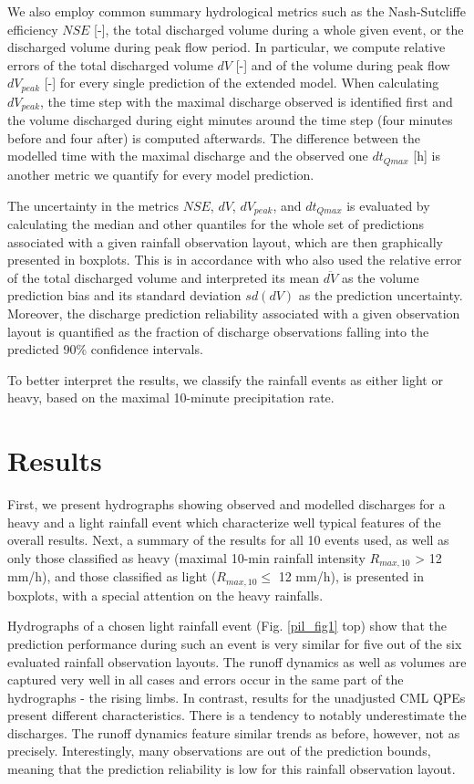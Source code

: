 \documentclass{ctuthesis}\usepackage[]{graphicx}\usepackage[]{color}
\begin{document}
We also employ common summary hydrological metrics such as the Nash-Sutcliffe efficiency $N\!S\!E$ [-], the total discharged volume during a whole given event, or the discharged volume during peak flow period.  In particular, we compute relative errors of the total discharged volume  $dV$ [-] and of the volume during peak flow $dV_{peak}$ [-] for every single prediction of the extended model. When calculating $dV_{peak}$, the time step with the maximal discharge observed is identified first and the volume discharged during eight minutes around the time step (four minutes before and four after) is computed afterwards. The difference between the modelled time with the maximal discharge and the observed one $dt_{Qmax}$ [h] is another metric we quantify for every model prediction. 

The uncertainty in the metrics $N\!S\!E$, $dV$, $dV_{peak}$, and $dt_{Qmax}$ is evaluated by calculating the median and other quantiles for the whole set of predictions associated with a given rainfall observation layout, which are then graphically presented in boxplots.  This is in accordance with \cite{fencl2013assessing} who also used the relative error of the total discharged volume and interpreted its mean $\overline{dV}$ as the volume prediction bias and its standard deviation $sd(dV)$ as the prediction uncertainty. Moreover, the discharge prediction reliability associated with a given observation layout is quantified as the fraction of discharge observations falling into the predicted 90\% confidence intervals.

To better interpret the results, we classify the rainfall events as either light or heavy, based on the maximal 10-minute precipitation rate. 



\section{Results}

First, we present hydrographs showing observed and modelled discharges for a heavy and a light rainfall event which characterize well typical features of the overall results. Next, a summary of the results for all 10 events used, as well as only those classified as heavy (maximal 10-min rainfall intensity $R_{max,10}$ > 12 mm/h), and those classified as light ($R_{max,10} \leq$ 12 mm/h), is presented in  boxplots, with a special attention on the heavy rainfalls.

Hydrographs of a chosen light rainfall event (Fig. \ref{pil_fig1} top) show that the prediction performance during such an event is very similar for five out of the six evaluated rainfall observation layouts. The runoff dynamics as well as volumes are captured very well in all cases and errors occur in the same part of the hydrographs -  the  rising limbs. In contrast, results for the unadjusted CML QPEs present different characteristics. There is a tendency to notably underestimate the discharges. The runoff dynamics feature similar trends as before, however, not as precisely. Interestingly, many observations are out of the prediction bounds, meaning that the prediction reliability is low for this rainfall observation layout.
\end{document}
